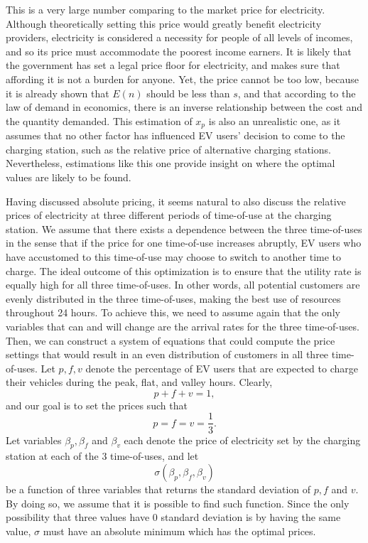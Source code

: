 \documentclass[10pt]{article}
\begin{document}
This is a very large number comparing to the market price for electricity. Although theoretically setting this price would greatly benefit electricity providers, electricity is considered a necessity for people of all levels of incomes, and so its price must accommodate the poorest income earners. It is likely that the government has set a legal price floor for electricity, and makes sure that affording it is not a burden for anyone. Yet, the price cannot be too low, because it is already shown that $E(n)$ should be less than $s$, and that according to the law of demand in economics, there is an inverse relationship between the cost and the quantity demanded. This estimation of $x_p$ is also an unrealistic one, as it assumes that no other factor has influenced EV users' decision to come to the charging station, such as the relative price of alternative charging stations. Nevertheless, estimations like this one provide insight on where the optimal values are likely to be found.

Having discussed absolute pricing, it seems natural to also discuss the relative prices of electricity at three different periods of time-of-use at the charging station. We assume that there exists a dependence between the three time-of-uses in the sense that if the price for one time-of-use increases abruptly, EV users who have accustomed to this time-of-use may choose to switch to another time to charge. The ideal outcome of this optimization is to ensure that the utility rate is equally high for all three time-of-uses. In other words, all potential customers are evenly distributed in the three time-of-uses, making the best use of resources throughout 24 hours. To achieve this, we need to assume again that the only variables that can and will change are the arrival rates for the three time-of-uses. Then, we can construct a system of equations that could compute the price settings that would result in an even distribution of customers in all three time-of-uses. Let $p,f,v$ denote the percentage of EV users that are expected to charge their vehicles during the peak, flat, and valley hours. Clearly, $$p + f + v = 1,$$ and our goal is to set the prices such that $$p = f = v = \frac{1}{3}.$$ Let variables $\beta_p,\beta_f$ and $\beta_v$ each denote the price of electricity set by the charging station at each of the 3 time-of-uses, and let $$\sigma(\beta_p, \beta_f, \beta_v)$$ be a function of three variables that returns the standard deviation of $p,f$ and $v$. By doing so, we assume that it is possible to find such function. Since the only possibility that three values have 0 standard deviation is by having the same value, $\sigma$ must have an absolute minimum which has the optimal prices.
\end{document}
